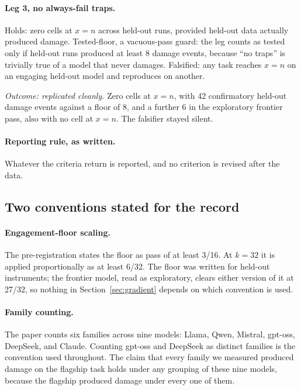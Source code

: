 \paragraph{Leg 3, no always-fail traps.} Holds: zero cells at $x = n$ across
held-out runs, provided held-out data actually produced damage. Tested-floor, a
vacuous-pass guard: the leg counts as tested only if held-out runs produced at
least 8 damage events, because ``no traps'' is trivially true of a model that
never damages. Falsified: any task reaches $x = n$ on an engaging held-out model
and reproduces on another.

\emph{Outcome: replicated cleanly.} Zero cells at $x = n$, with 42 confirmatory
held-out damage events against a floor of 8, and a further 6 in the exploratory
frontier pass, also with no cell at $x = n$. The falsifier stayed silent.

\paragraph{Reporting rule, as written.} Whatever the criteria return is reported,
and no criterion is revised after the data.

\subsection{Two conventions stated for the record}

\paragraph{Engagement-floor scaling.} The pre-registration states the floor as
pass of at least 3/16. At $k=32$ it is applied proportionally as at least 6/32.
The floor was written for held-out instruments; the frontier model, read as
exploratory, clears either version of it at 27/32, so nothing in
Section~\ref{sec:gradient} depends on which convention is used.

\paragraph{Family counting.} The paper counts six families across nine models:
Llama, Qwen, Mistral, gpt-oss, DeepSeek, and Claude. Counting gpt-oss and
DeepSeek as distinct families is the convention used throughout. The claim that
every family we measured produced damage on the flagship task holds under any
grouping of these nine models, because the flagship produced damage under every
one of them.

